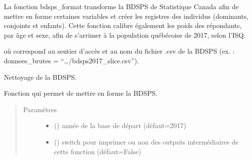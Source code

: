 \documentclass[letterpaper,10pt,french]{sphinxmanual}
\begin{document}

La fonction bdsps\_format transforme la BDSPS de Statistique Canada afin de mettre en forme certaines variables et créer les registres des individus (dominants, conjoints et enfants).
Cette fonction calibre également les poids des répondants, par âge et sexe, afin de s’arrimer à la population québécoise de 2017, selon l’ISQ.

\begin{sphinxVerbatim}[commandchars=\\\{\}]
\end{sphinxVerbatim}

où  correspond au sentier d’accès et au nom du fichier .csv de la BDSPS (ex. : donnees\_brutes = “…/bdsps2017\_slice.csv”).


\begin{fulllineitems}
\label{\detokenize{utilisation:simgen.bdsps}}
Nettoyage de la BDSPS.

Fonction qui permet de mettre en forme la BDSPS.
\begin{quote}\begin{description}
\item[{Paramètres}] \leavevmode\begin{itemize}
\item {} 
 () \textendash{} année de la base de départ (défaut=2017)

\item {} 
 () \textendash{} switch pour imprimer ou non des outputs intermédiaires de cette fonction (défaut=False)

\end{itemize}

\end{description}\end{quote}

\end{fulllineitems}
\end{document}
